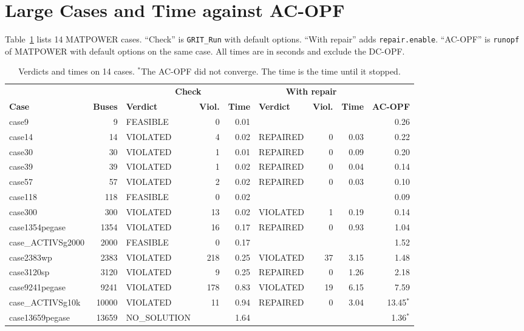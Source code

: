 \documentclass[a4paper,11pt]{article}
\newcommand{\opt}[1]{\texttt{#1}}
\begin{document}
\section{Large Cases and Time against AC-OPF}\label{sec:largecases}

Table~\ref{tab:timing} lists 14 MATPOWER cases. ``Check'' is \texttt{GRIT\_Run} with default options. ``With repair'' adds \opt{repair.enable}. ``AC-OPF'' is \texttt{runopf} of MATPOWER with default options on the same case. All times are in seconds and exclude the DC-OPF.

\begin{table}[H]\centering\small
\begin{tabular}{@{}lrlrrlrrr@{}}
\toprule
 & & \multicolumn{3}{c}{\textbf{Check}} & \multicolumn{3}{c}{\textbf{With repair}} & \\
\cmidrule(lr){3-5}\cmidrule(lr){6-8}
\textbf{Case} & \textbf{Buses} & \textbf{Verdict} & \textbf{Viol.} & \textbf{Time} & \textbf{Verdict} & \textbf{Viol.} & \textbf{Time} & \textbf{AC-OPF} \\
\midrule
case9 & 9 & FEASIBLE & 0 & 0.01 & & & & 0.26 \\
case14 & 14 & VIOLATED & 4 & 0.02 & REPAIRED & 0 & 0.03 & 0.22 \\
case30 & 30 & VIOLATED & 1 & 0.01 & REPAIRED & 0 & 0.09 & 0.20 \\
case39 & 39 & VIOLATED & 1 & 0.02 & REPAIRED & 0 & 0.04 & 0.14 \\
case57 & 57 & VIOLATED & 2 & 0.02 & REPAIRED & 0 & 0.03 & 0.10 \\
case118 & 118 & FEASIBLE & 0 & 0.02 & & & & 0.09 \\
case300 & 300 & VIOLATED & 13 & 0.02 & VIOLATED & 1 & 0.19 & 0.14 \\
case1354pegase & 1354 & VIOLATED & 16 & 0.17 & REPAIRED & 0 & 0.93 & 1.04 \\
case\_ACTIVSg2000 & 2000 & FEASIBLE & 0 & 0.17 & & & & 1.52 \\
case2383wp & 2383 & VIOLATED & 218 & 0.25 & VIOLATED & 37 & 3.15 & 1.48 \\
case3120sp & 3120 & VIOLATED & 9 & 0.25 & REPAIRED & 0 & 1.26 & 2.18 \\
case9241pegase & 9241 & VIOLATED & 178 & 0.83 & VIOLATED & 19 & 6.15 & 7.59 \\
case\_ACTIVSg10k & 10000 & VIOLATED & 11 & 0.94 & REPAIRED & 0 & 3.04 & 13.45$^{*}$ \\
case13659pegase & 13659 & NO\_SOLUTION & & 1.64 & & & & 1.36$^{*}$ \\
\bottomrule
\end{tabular}
\caption{Verdicts and times on 14 cases. $^{*}$The AC-OPF did not converge. The time is the time until it stopped.}\label{tab:timing}
\end{table}
\end{document}

